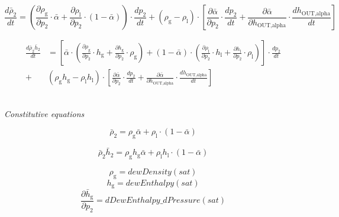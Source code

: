 \documentclass[11pt]{article} %
\begin{document}
\begin{equation}
\frac{d \bar{\rho}_\text{2}}{d t} = ( \frac{\partial \rho_\text{g}}{\partial p_\text{2}} \cdot \bar{\alpha} +  \frac{\partial \rho_\text{l}}{\partial p_\text{2}} \cdot  (1 - \bar{\alpha})) \cdot  \frac{d p_\text{2}}{d t} + (\rho_\text{g} - \rho_\text{l}) \cdot [\frac{\partial \bar{\alpha}}{\partial p_\text{2}} \cdot  \frac{d p_\text{2}}{d t} + \frac{\partial \bar{\alpha}}{\partial h_\text{OUT,alpha}} \cdot \frac{d h_\text{OUT,alpha}}{d t} ]
\end{equation}


\begin{equation} \begin{split}
 \frac{d \bar{\rho}_\text{2} \bar{h}_\text{2}}{d t} &=  [\bar{\alpha} \cdot ( \frac{\partial \rho_\text{g}}{\partial p_\text{2}} \cdot h_\text{g} + \frac{\partial h_\text{g}}{\partial p_\text{2}} \cdot \rho_\text{g} )  + ( 1- \bar{\alpha}) \cdot (  \frac{\partial \rho_\text{l}}{\partial p_\text{2}} \cdot h_\text{l} + \frac{\partial h_\text{l}}{\partial p_\text{2}} \cdot \rho_\text{l} )] \cdot \frac{d p_\text{2}}{d t} \\+
 &(\rho_\text{g}h_\text{g} - \rho_\text{l}h_\text{l}) \cdot  [\frac{\partial \bar{\alpha}}{\partial p_\text{2}} \cdot  \frac{d p_\text{2}}{d t} + \frac{\partial \bar{\alpha}}{\partial h_\text{OUT,alpha}} \cdot \frac{d h_\text{OUT,alpha}}{d t} ]
\end{split}
\end{equation}\\

\begin{center}
\textit{Constitutive equations}
\end{center}
\begin{equation}
\bar{\rho}_\text{2} = \rho_\text{g} \bar{\alpha} + \rho_\text{l} \cdot (1 - \bar{\alpha})
\end{equation}

\begin{equation}
\bar{\rho}_\text{2} \bar{h}_\text{2}= \rho_\text{g} h_\text{g} \bar{\alpha} + \rho_\text{l} h_\text{l} \cdot (1 - \bar{\alpha})
\end{equation}

\begin{equation}
\rho_\text{g} = dewDensity(sat)
\end{equation}
\begin{equation}
h_\text{g} = dewEnthalpy(sat)
\end{equation}
\begin{equation}
\frac{\partial \bar{h}_\text{g}}{\partial p_\text{2}}= dDewEnthalpy\_dPressure(sat)
\end{equation}
\end{document}
